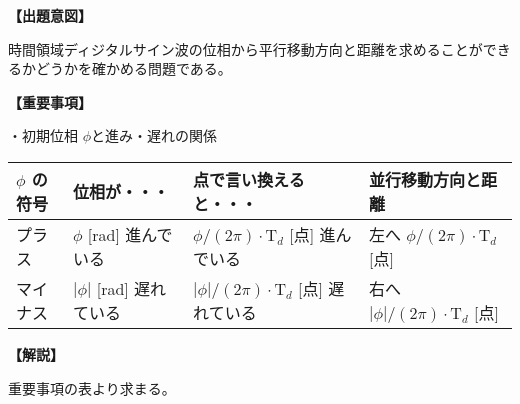 \noindent \textbf{【出題意図】}

\bigskip
\noindent 時間領域ディジタルサイン波の位相から平行移動方向と距離を求めることができるかどうかを確かめる問題である。

\vspace{1em}
\noindent \textbf{【重要事項】}

\noindent ・初期位相 $\phi$と進み・遅れの関係

\medskip
\begin{center}
\small
\begin{tabularx}{0.9\fbwidth}{|X|X|X|X|}
\hline
$\phi$ の符号&  位相が・・・   & 点で言い換えると・・・   & 並行移動方向と距離 \\
\hline
プラス &  $\phi$ [rad] 進んでいる & $\phi/(2\pi) \cdot \textrm{T}_d$ [点] 進んでいる & 左へ $\phi/(2\pi) \cdot \textrm{T}_d$ [点] \\
\hline
マイナス &  $|\phi|$ [rad] 遅れている & $|\phi|/(2\pi) \cdot \textrm{T}_d$ [点] 遅れている & 右へ $|\phi|/(2\pi) \cdot \textrm{T}_d$ [点] \\
\hline
\end{tabularx}
\end{center}

\bigskip

\vspace{1em}
\noindent \textbf{【解説】}

\bigskip
\noindent 重要事項の表より求まる。
